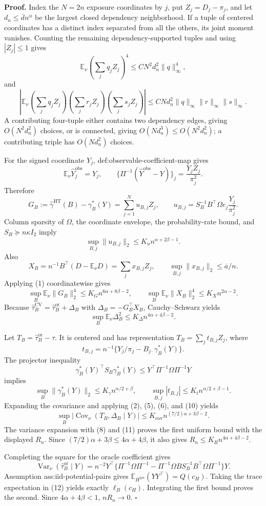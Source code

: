 \textbf{Proof.}
Index the \(N=2n\) exposure coordinates by \(j\), put \(Z_j=D_j-\pi_j\), and let \(d_n\le\overline d n^\alpha\) be the largest closed dependency neighborhood.  If a tuple of centered coordinates has a distinct index separated from all the others, its joint moment vanishes.  Counting the remaining dependency-supported tuples and using \(|Z_j|\le1\) gives
\[
\mathbb E_\nu\left(\sum_jq_jZ_j\right)^4
\le C N^2d_n^2\lVert q\rVert_\infty^4,
\tag{1}
\]
and
\[
\left|\mathbb E_\nu
\left(\sum_jq_jZ_j\right)
\left(\sum_jr_jZ_j\right)
\left(\sum_js_jZ_j\right)\right|
\le C Nd_n^2\lVert q\rVert_\infty\lVert r\rVert_\infty\lVert s\rVert_\infty.
\tag{2}
\]
A contributing four-tuple either contains two dependency edges, giving \(O(N^2d_n^2)\) choices, or is connected, giving \(O(Nd_n^3)\le O(N^2d_n^2)\); a contributing triple has \(O(Nd_n^2)\) choices.

For the signed coordinate \(Y_j\), def:observable-coefficient-map gives
\[
\mathbb E_\nu\widehat Y_j^{\mathrm{obs}}=Y_j,
\qquad
\{\Pi^{-1}(\widehat Y^{\mathrm{obs}}-Y)\}_j
=\frac{Y_jZ_j}{\pi_j^2}.
\tag{3}
\]
Therefore
\[
G_B:=\widehat\gamma^{\mathrm{HT}}(B)-\gamma_B^*(Y)
=\sum_{j=1}^{N}u_{B,j}Z_j,
\qquad
u_{B,j}=S_B^{-1}B^{\top}\Omega e_j\frac{Y_j}{\pi_j^2}.
\tag{4}
\]
Column sparsity of \(\Omega\), the coordinate envelope, the probability-rate bound, and \(S_B\succeq n\kappa I_2\) imply
\[
\sup_{B,j}\lVert u_{B,j}\rVert_2\le K_un^{\alpha+2\beta-1}.
\tag{5}
\]
Also
\[
X_B=n^{-1}B^{\top}(D-\mathbb E_\nu D)=\sum_jx_{B,j}Z_j,
\qquad \sup_{B,j}\lVert x_{B,j}\rVert_2\le\overline a/n.
\tag{6}
\]
Applying (1) coordinatewise gives
\[
\sup_B\mathbb E_\nu\lVert G_B\rVert_2^4
\le K_Gn^{6\alpha+8\beta-2},
\qquad
\sup_B\mathbb E_\nu\lVert X_B\rVert_2^4
\le K_Xn^{2\alpha-2}.
\tag{7}
\]
Because \(\widehat\tau_B^{\mathrm{CV}}=\widehat\tau_B^{\mathrm{or}}+\Delta_B\) with \(\Delta_B=-G_B^{\top}X_B\), Cauchy--Schwarz yields
\[
\sup_B\mathbb E_\nu\Delta_B^2
\le K_\Delta n^{4\alpha+4\beta-2}.
\tag{8}
\]

Let \(T_B=\widehat\tau_B^{\mathrm{or}}-\tau\).  It is centered and has representation \(T_B=\sum_jt_{B,j}Z_j\), where
\[
t_{B,j}=n^{-1}\{Y_j/\pi_j-B_{j\cdot}\gamma_B^*(Y)\}.
\tag{9}
\]
The projector inequality
\[
\gamma_B^*(Y)^{\top}S_B\gamma_B^*(Y)
\le Y^{\top}\Pi^{-1}\Omega\Pi^{-1}Y
\]
implies
\[
\sup_B\lVert\gamma_B^*(Y)\rVert_2\le K_\gamma n^{\alpha/2+\beta},
\qquad
\sup_{B,j}|t_{B,j}|\le K_tn^{\alpha/2+\beta-1}.
\tag{10}
\]
Expanding the covariance and applying (2), (5), (6), and (10) yields
\[
\sup_B|\operatorname{Cov}_\nu(T_B,\Delta_B\mid Y)|
\le K_{\mathrm{cov}}n^{(7/2)\alpha+3\beta-2}.
\tag{11}
\]
The variance expansion with (8) and (11) proves the first uniform bound with the displayed \(R_n\).  Since \((7/2)\alpha+3\beta\le4\alpha+4\beta\), it also gives \(R_n\le K_Rn^{4\alpha+4\beta-2}\).

Completing the square for the oracle coefficient gives
\[
\operatorname{Var}_\nu(\widehat\tau_B^{\mathrm{or}}\mid Y)
=n^{-2}Y^{\top}\{\Pi^{-1}\Omega\Pi^{-1}
-\Pi^{-1}\Omega BS_B^{-1}B^{\top}\Omega\Pi^{-1}\}Y.
\tag{12}
\]
Assumption ass:iid-potential-pairs gives \(\mathbb E_{H^{\otimes n}}(YY^{\top})=Q(c_H)\).  Taking the trace expectation in (12) yields exactly \(\ell_B(c_H)\).  Integrating the first bound proves the second.  Since \(4\alpha+4\beta<1\), \(nR_n\to0\). \(\square\)